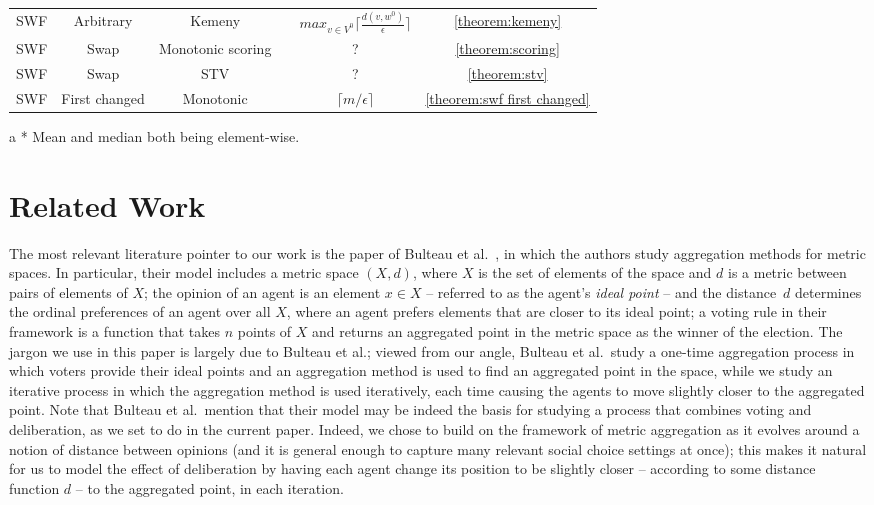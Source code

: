 \documentclass[runningheads,envcountsame]{llncs}
\newcommand{\cmark}{\ding{51}}
\begin{document}
\begin{table}[t]
{\begin{center}
\begin{tabular}{c c c | c c c}
SWF
& Arbitrary
& Kemeny
& \cmark
& $max_{v \in V^0} \lceil\frac{d(v, w^0)}{\epsilon}\rceil$
& \ref{theorem:kemeny}
\\
SWF
& Swap
& Monotonic scoring 
& \cmark
& ?
& \ref{theorem:scoring}
\\
SWF
& Swap
& STV
& \cmark
& ?
& \ref{theorem:stv}
\\
SWF
& First changed
& Monotonic
& \cmark
& $\lceil m/\epsilon \rceil$
& \ref{theorem:swf first changed}
\\
\end{tabular}
\end{center}
}
\begin{tablenotes}
    \setlength{\itemindent}{15pt}
    \item[a] * Mean and median both being element-wise.
\end{tablenotes}
\end{table}

\section{Related Work}\label{section:related work}
%
The most relevant literature pointer to our work is the paper of Bulteau et al.~\cite{bulteau2021aggregation}, in which the authors study aggregation methods for metric spaces. In particular, their model includes a metric space $(X, d)$, where $X$ is the set of elements of the space and $d$ is a metric between pairs of elements of $X$; the opinion of an agent is an element $x \in X$ -- referred to as the agent's \emph{ideal point} -- and the distance~$d$ determines the ordinal preferences of an agent over all $X$, where an agent prefers elements that are closer to its ideal point; a voting rule in their framework is a function that takes $n$ points of $X$ and returns an aggregated point in the metric space as the winner of the election.
%
The jargon we use in this paper is largely due to Bulteau et al.; viewed from our angle, Bulteau et al.\ study a one-time aggregation process in which voters provide their ideal points and an aggregation method is used to find an aggregated point in the space, while we study an iterative process in which the aggregation method is used iteratively, each time causing the agents to move slightly closer to the aggregated point. Note that Bulteau et al.\ mention that their model may be indeed the basis for studying a process that combines voting and deliberation, as we set to do in the current paper. Indeed, we chose to build on the framework of metric aggregation as it evolves around a notion of distance between opinions (and it is general enough to capture many relevant social choice settings at once); this makes it natural for us to model the effect of deliberation by having each agent change its position to be slightly closer -- according to some distance function $d$ -- to the aggregated point, in each iteration.
\end{document}

